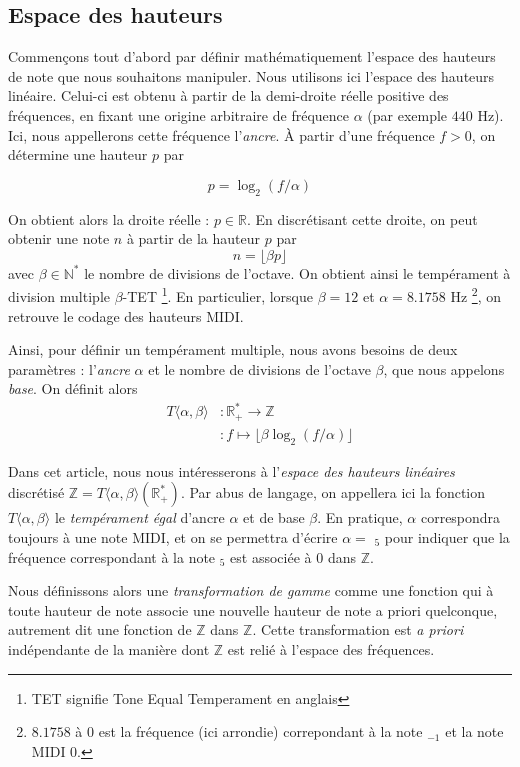 \documentclass{article}
\begin{document}
\subsection{Espace des hauteurs}
Commençons tout d'abord par définir mathématiquement l'espace des hauteurs de note que nous souhaitons manipuler. Nous utilisons ici l'espace des hauteurs linéaire. Celui-ci est obtenu à partir de la demi-droite réelle positive des fréquences, en fixant une origine arbitraire de fréquence $\alpha$ (par exemple $440$ Hz). Ici, nous appellerons cette fréquence l'\emph{ancre}.  À partir d'une fréquence $f>0$, on détermine une hauteur $p$ par

$$p = \log_2(f/\alpha)$$

On obtient alors la droite réelle : $p\in \mathbb{R}$. En discrétisant cette droite, on peut obtenir une note $n$ à partir de la hauteur $p$ par 
$$n = \lfloor \beta p \rfloor$$
\noindent avec $\beta\in \mathbb{N}^*$ le nombre de divisions de l'octave. On obtient ainsi le tempérament à division multiple $\beta$-TET \footnote{TET signifie Tone Equal Temperament en anglais}. En particulier, lorsque $\beta = 12$ et $\alpha = 8.1758$ Hz \footnote{ $8.1758$ à $0$ est la fréquence (ici arrondie) correpondant à la note $_{-1}$ et la note MIDI $0$.}, on retrouve le codage des hauteurs MIDI.

Ainsi, pour définir un tempérament multiple, nous avons besoins de deux paramètres : l'\emph{ancre} $\alpha$  et le nombre de divisions de l'octave $\beta$, que nous appelons \emph{base}. On définit alors \begin{align*}
  T\langle \alpha, \beta \rangle &: \mathbb{R}_+^* \rightarrow \mathbb{Z}\\
  &:f \mapsto \lfloor \beta \log_2(f/\alpha)\rfloor
\end{align*}


Dans cet article, nous nous intéresserons à l'\emph{espace des hauteurs linéaires} discrétisé $\mathbb{Z} = T\langle\alpha, \beta \rangle (\mathbb{R^*_+})$. Par abus de langage, on appellera ici la fonction $T\langle \alpha, \beta \rangle$ le \emph{tempérament égal} d'ancre $\alpha$ et de base $\beta$. En pratique, $\alpha$ correspondra toujours à une note MIDI, et on se permettra d'écrire $\alpha =$ $_5$ pour indiquer que la fréquence correspondant à la note $_5$ est associée à $0$ dans $\mathbb{Z}$.

Nous définissons alors une \emph{transformation de gamme} comme une fonction qui à toute hauteur de note associe une nouvelle hauteur de note a priori quelconque, autrement dit une fonction de $\mathbb{Z}$ dans $\mathbb{Z}$. Cette transformation est \emph{a priori} indépendante de la manière dont $\mathbb{Z}$ est relié à l'espace des fréquences.
\end{document}
